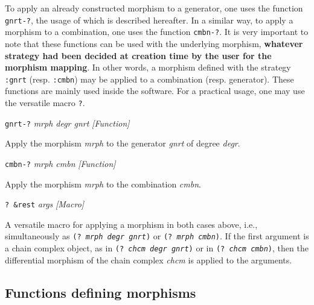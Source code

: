 To apply an already constructed morphism to a generator,
one uses the function  {\tt gnrt-?},
the usage of which is described hereafter. In a similar way, to apply a morphism to a combination,
one uses the function {\tt cmbn-?}.
It is very important to note that these functions
can be used with the underlying morphism, {\bf whatever strategy had been decided
at creation time by the user for the morphism mapping}. In other words, a morphism defined
with the strategy {\tt :gnrt} (resp. {\tt :cmbn}) may be applied to a combination (resp.  generator).
These functions are mainly used inside the software. For a practical usage, one may use the versatile macro
{\tt ?}.
\vskip 0.35cm
{\parindent=0mm
{\leftskip=5mm
{\tt gnrt-?} {\em mrph degr gnrt} \hfill {\em [Function]} \par}
{\leftskip=15mm
Apply the morphism {\em mrph} to the generator  {\em gnrt} of degree {\em degr}. \par}
{\leftskip=5mm
{\tt cmbn-?} {\em mrph cmbn} \hfill {\em [Function]} \par}
{\leftskip=15mm
Apply the morphism {\em mrph} to the combination  {\em cmbn}. \par}
{\leftskip=5mm
{\tt ? \&rest} {\em args} \hfill {\em [Macro]} \par}
{\leftskip=15mm
A versatile macro for applying a morphism  in both cases above, i.e., simultaneously
as {\tt (? {\em mrph degr gnrt})} or  {\tt (? {\em mrph cmbn})}. If the first argument
is a chain complex object, as in  {\tt (? {\em chcm degr gnrt})} or in  {\tt (? {\em chcm cmbn})}, then
the differential morphism of the chain complex {\em chcm} is applied to the arguments. \par}
}

\newpage

\subsection {Functions defining morphisms}

